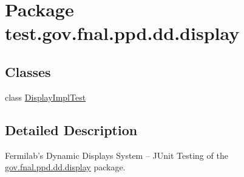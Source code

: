 \hypertarget{namespacetest_1_1gov_1_1fnal_1_1ppd_1_1dd_1_1display}{\section{Package test.\-gov.\-fnal.\-ppd.\-dd.\-display}
\label{namespacetest_1_1gov_1_1fnal_1_1ppd_1_1dd_1_1display}
}
\subsection*{Classes}
\begin{DoxyCompactItemize}
\item 
class \hyperlink{classtest_1_1gov_1_1fnal_1_1ppd_1_1dd_1_1display_1_1DisplayImplTest}{Display\-Impl\-Test}
\end{DoxyCompactItemize}


\subsection{Detailed Description}
Fermilab's Dynamic Displays System -- J\-Unit Testing of the \hyperlink{namespacetest_1_1gov_1_1fnal_1_1ppd_1_1dd_1_1display}{gov.\-fnal.\-ppd.\-dd.\-display} package.